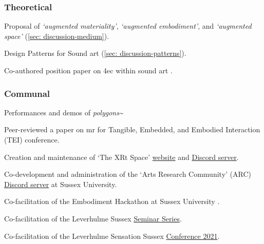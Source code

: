 \begin{SingleSpace}
    \subsubsection{Theoretical}
    \begin{noitemize}
        \item Proposal of \textit{`augmented materiality'}, \textit{`augmented embodiment'}, and \textit{`augmented space'} (\autoref{sec: discussion-medium}).
        \item Design Patterns for Sound \gls{art} (\autoref{sec: discussion-patterns}).
        \item Co-authored position paper on \gls{4ec} within sound \gls{art} \citep{bilbow2021}.
    \end{noitemize}
\subsubsection{Communal}
    \begin{noitemize}
        \item Performances and demos of \textit{polygons\textasciitilde{}} \citep{bilbow2022b,bilbow2022a}
        \item Peer-reviewed a paper on \gls{mr} for Tangible, Embedded, and Embodied Interaction (TEI) conference.
        \item Creation and maintenance of `The XRt Space' \href{https://sambilbow.github.io/thexrtspace}{website} and \href{https://discord.gg/p3MmURSBV3}{Discord server}.
        \item Co-development and administration of the `Arts Research Community' (ARC) \href{https://discord.gg/8dfsZDgwN8}{Discord server} at Sussex University. 
        \item Co-facilitation of the Embodiment Hackathon at Sussex University \citep{bonarjee2022}.
        \item Co-facilitation of the Leverhulme Sussex \href{https://www.sussex.ac.uk/sensation/training/seminars}{Seminar Series}.
        \item Co-facilitation of the Leverhulme Sensation Sussex \href{https://www.sussex.ac.uk/sensation/training/conference-2021}{Conference 2021}.
    \end{noitemize}
\end{SingleSpace}




